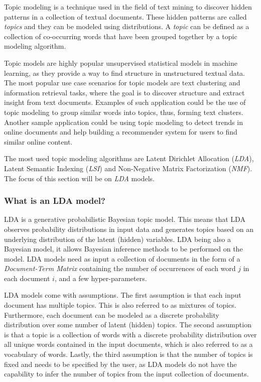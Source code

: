         Topic modeling is a technique used in the field of text mining to discover hidden patterns in a collection of textual documents. These hidden patterns are called \emph{topics} and they can be modeled using distributions. A \emph{topic} can be defined as a collection of co-occurring words that have been grouped together by a topic modeling algorithm.
        
        Topic models are highly popular unsupervised statistical models in machine learning, as they provide a way to find structure in unstructured textual data. The most popular use case scenarios for topic models are text clustering and information retrieval tasks, where the goal is to discover structure and extract insight from text documents. Examples of such application could be the use of topic modeling to group similar words into topics, thus, forming text clusters. Another sample application could be using topic modeling to detect trends in online documents and help building a recommender system for users to find similar online content. 
        
        The most used topic modeling algorithms are Latent Dirichlet Allocation (\emph{LDA}), Latent Semantic Indexing (\emph{LSI}) and Non-Negative Matrix Factorization (\emph{NMF}). The focus of this section will be on \emph{LDA} models.
    
        \subsubsection{What is an LDA model?}
            
           LDA is a generative probabilistic Bayesian topic model. This means that LDA observes probability distributions in input data and generates topics based on an underlying distribution of the latent (hidden) variables. LDA being also a Bayesian model, it allows Bayesian inference methods to be performed on the model. LDA models need as input a collection of documents in the form of a \emph{Document-Term Matrix} containing the number of occurrences of each word $j$ in each document $i$, and a few hyper-parameters. 
           
           LDA models come with assumptions. The first assumption is that each input document has multiple topics. This is also referred to as mixtures of topics. Furthermore, each document can be modeled as a discrete probability distribution over some number of latent (hidden) topics. The second assumption is that a topic is a collection of words with a discrete probability distribution over all unique words contained in the input documents, which is also referred to as a vocabulary of words. Lastly, the third assumption is that the number of topics is fixed and needs to be specified by the user, as LDA models do not have the capability to infer the number of topics from the input collection of documents.
           
